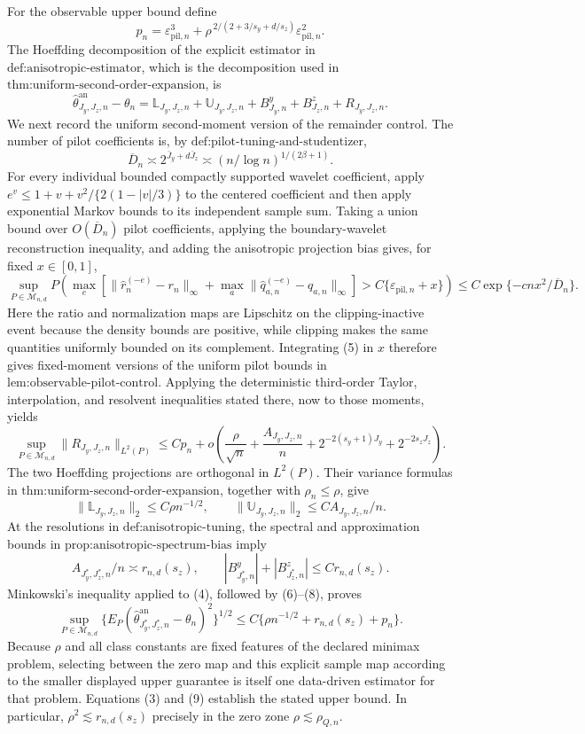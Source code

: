 For the observable upper bound define
\[
p_n=\varepsilon_{\mathrm{pil},n}^3
+\rho^{\,2/(2+3/s_y+d/s_z)}\varepsilon_{\mathrm{pil},n}^2.
\]
The Hoeffding decomposition of the explicit estimator in \(\text{def:anisotropic-estimator}\), which is the decomposition used in \(\text{thm:uniform-second-order-expansion}\), is
\[
\widehat\theta^{\mathrm{an}}_{J_y,J_z,n}-\theta_n
=\mathbb L_{J_y,J_z,n}+\mathbb U_{J_y,J_z,n}
+B^y_{J_y,n}+B^z_{J_z,n}+R_{J_y,J_z,n}. \tag{4}
\]
We next record the uniform second-moment version of the remainder control.  The number of pilot coefficients is, by \(\text{def:pilot-tuning-and-studentizer}\),
\[
\overline D_n\asymp2^{\bar J_y+d\bar J_z}
\asymp(n/\log n)^{1/(2\beta+1)}.
\]
For every individual bounded compactly supported wavelet coefficient, apply \(e^v\le1+v+v^2/\{2(1-|v|/3)\}\) to the centered coefficient and then apply exponential Markov bounds to its independent sample sum.  Taking a union bound over \(O(\overline D_n)\) pilot coefficients, applying the boundary-wavelet reconstruction inequality, and adding the anisotropic projection bias gives, for fixed \(x\in[0,1]\),
\[
\sup_{P\in\mathcal M_{n,d}}
P\!\left(\max_e\left[\|\widehat r_n^{(-e)}-r_n\|_\infty
+\max_a\|\widehat q_{a,n}^{(-e)}-q_{a,n}\|_\infty\right]
>C\{\varepsilon_{\mathrm{pil},n}+x\}\right)
\le C\exp\{-cnx^2/\overline D_n\}. \tag{5}
\]
Here the ratio and normalization maps are Lipschitz on the clipping-inactive event because the density bounds are positive, while clipping makes the same quantities uniformly bounded on its complement.  Integrating (5) in \(x\) therefore gives fixed-moment versions of the uniform pilot bounds in \(\text{lem:observable-pilot-control}\).  Applying the deterministic third-order Taylor, interpolation, and resolvent inequalities stated there, now to those moments, yields
\[
\sup_{P\in\mathcal M_{n,d}}\|R_{J_y,J_z,n}\|_{L^2(P)}
\le Cp_n+o\!\left(\frac\rho{\sqrt n}+\frac{A_{J_y,J_z,n}}n
+2^{-2(s_y+1)J_y}+2^{-2s_zJ_z}\right). \tag{6}
\]
The two Hoeffding projections are orthogonal in \(L^2(P)\).  Their variance formulas in \(\text{thm:uniform-second-order-expansion}\), together with \(\rho_n\le\rho\), give
\[
\|\mathbb L_{J_y,J_z,n}\|_2\le C\rho n^{-1/2},
\qquad
\|\mathbb U_{J_y,J_z,n}\|_2\le C A_{J_y,J_z,n}/n. \tag{7}
\]
At the resolutions in \(\text{def:anisotropic-tuning}\), the spectral and approximation bounds in \(\text{prop:anisotropic-spectrum-bias}\) imply
\[
A_{J_y^*,J_z^*,n}/n\asymp r_{n,d}(s_z),
\qquad
|B^y_{J_y^*,n}|+|B^z_{J_z^*,n}|\le Cr_{n,d}(s_z). \tag{8}
\]
Minkowski's inequality applied to (4), followed by (6)--(8), proves
\[
\sup_{P\in\mathcal M_{n,d}}
\{E_P(\widehat\theta^{\mathrm{an}}_{J_y^*,J_z^*,n}-\theta_n)^2\}^{1/2}
\le C\{\rho n^{-1/2}+r_{n,d}(s_z)+p_n\}. \tag{9}
\]
Because \(\rho\) and all class constants are fixed features of the declared minimax problem, selecting between the zero map and this explicit sample map according to the smaller displayed upper guarantee is itself one data-driven estimator for that problem.  Equations (3) and (9) establish the stated upper bound.  In particular, \(\rho^2\lesssim r_{n,d}(s_z)\) precisely in the zero zone \(\rho\lesssim\rho_{Q,n}\).

